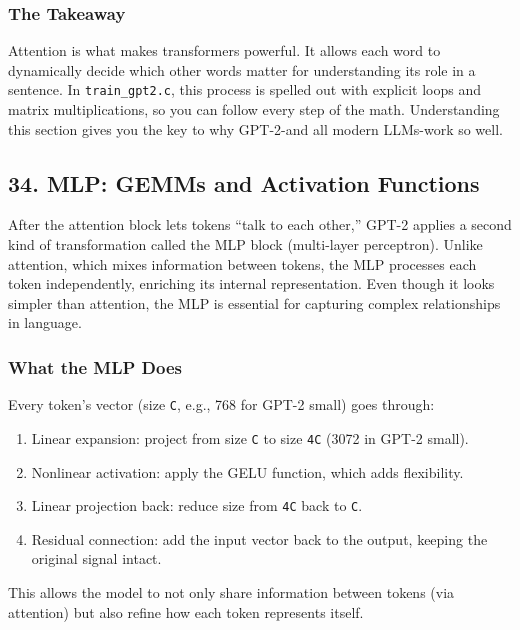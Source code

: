 \documentclass[
  letterpaper,
  DIV=11,
  numbers=noendperiod]{scrreprt}
\providecommand{\tightlist}{%
  \setlength{\itemsep}{0pt}\setlength{\parskip}{0pt}}
\begin{document}
\subsubsection{The Takeaway}\label{the-takeaway-22}

Attention is what makes transformers powerful. It allows each word to
dynamically decide which other words matter for understanding its role
in a sentence. In \texttt{train\_gpt2.c}, this process is spelled out
with explicit loops and matrix multiplications, so you can follow every
step of the math. Understanding this section gives you the key to why
GPT-2-and all modern LLMs-work so well.

\subsection{34. MLP: GEMMs and Activation
Functions}\label{mlp-gemms-and-activation-functions}

After the attention block lets tokens ``talk to each other,'' GPT-2
applies a second kind of transformation called the MLP block
(multi-layer perceptron). Unlike attention, which mixes information
between tokens, the MLP processes each token independently, enriching
its internal representation. Even though it looks simpler than
attention, the MLP is essential for capturing complex relationships in
language.

\subsubsection{What the MLP Does}\label{what-the-mlp-does}

Every token's vector (size \texttt{C}, e.g., 768 for GPT-2 small) goes
through:

\begin{enumerate}
\def\labelenumi{\arabic{enumi}.}
\tightlist
\item
  Linear expansion: project from size \texttt{C} to size \texttt{4C}
  (3072 in GPT-2 small).
\item
  Nonlinear activation: apply the GELU function, which adds flexibility.
\item
  Linear projection back: reduce size from \texttt{4C} back to
  \texttt{C}.
\item
  Residual connection: add the input vector back to the output, keeping
  the original signal intact.
\end{enumerate}

This allows the model to not only share information between tokens (via
attention) but also refine how each token represents itself.
\end{document}
